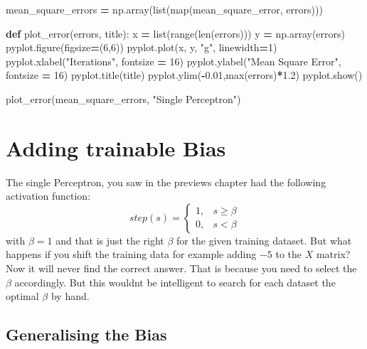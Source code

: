 \documentclass[
]{book}
\newenvironment{Shaded}{\begin{snugshade}}{\end{snugshade}}
\newcommand{\BuiltInTok}[1]{#1}
\newcommand{\DecValTok}[1]{\textcolor[rgb]{0.00,0.00,0.81}{#1}}
\newcommand{\FloatTok}[1]{\textcolor[rgb]{0.00,0.00,0.81}{#1}}
\newcommand{\KeywordTok}[1]{\textcolor[rgb]{0.13,0.29,0.53}{\textbf{#1}}}
\newcommand{\NormalTok}[1]{#1}
\newcommand{\OperatorTok}[1]{\textcolor[rgb]{0.81,0.36,0.00}{\textbf{#1}}}
\newcommand{\StringTok}[1]{\textcolor[rgb]{0.31,0.60,0.02}{#1}}
\begin{document}
\begin{Shaded}
\begin{Highlighting}[]
\NormalTok{mean\_square\_errors }\OperatorTok{=}\NormalTok{ np.array(}\BuiltInTok{list}\NormalTok{(}\BuiltInTok{map}\NormalTok{(mean\_square\_error, errors)))}


\KeywordTok{def}\NormalTok{ plot\_error(errors, title):}
\NormalTok{  x }\OperatorTok{=} \BuiltInTok{list}\NormalTok{(}\BuiltInTok{range}\NormalTok{(}\BuiltInTok{len}\NormalTok{(errors)))}
\NormalTok{  y }\OperatorTok{=}\NormalTok{ np.array(errors)}
\NormalTok{  pyplot.figure(figsize}\OperatorTok{=}\NormalTok{(}\DecValTok{6}\NormalTok{,}\DecValTok{6}\NormalTok{))}
\NormalTok{  pyplot.plot(x, y, }\StringTok{"g"}\NormalTok{, linewidth}\OperatorTok{=}\DecValTok{1}\NormalTok{)}
\NormalTok{  pyplot.xlabel(}\StringTok{"Iterations"}\NormalTok{, fontsize }\OperatorTok{=} \DecValTok{16}\NormalTok{)}
\NormalTok{  pyplot.ylabel(}\StringTok{"Mean Square Error"}\NormalTok{, fontsize }\OperatorTok{=} \DecValTok{16}\NormalTok{)}
\NormalTok{  pyplot.title(title)}
\NormalTok{  pyplot.ylim(}\OperatorTok{{-}}\FloatTok{0.01}\NormalTok{,}\BuiltInTok{max}\NormalTok{(errors)}\OperatorTok{*}\FloatTok{1.2}\NormalTok{)}
\NormalTok{  pyplot.show()}
  
  
\NormalTok{plot\_error(mean\_square\_errors, }\StringTok{"Single Perceptron"}\NormalTok{)}
\end{Highlighting}
\end{Shaded}

\hypertarget{adding-trainable-bias}{%
\chapter{Adding trainable Bias}\label{adding-trainable-bias}}

The single Perceptron, you saw in the previews chapter had the following activation function:
\[ 
step(s)= 
\begin{cases}
    1,& s   \geq \beta\\
    0,& s < \beta
\end{cases}
\]
with \(\beta = 1\) and that is just the right \(\beta\) for the given training dataset. But what happens if you shift the training data for example adding \(-5\) to the \(X\) matrix? Now it will never find the correct answer. That is because you need to select the \(\beta\) accordingly. But this wouldnt be intelligent to search for each dataset the optimal \(\beta\) by hand.

\hypertarget{generalising-the-bias}{%
\section{Generalising the Bias}\label{generalising-the-bias}}
\end{document}
